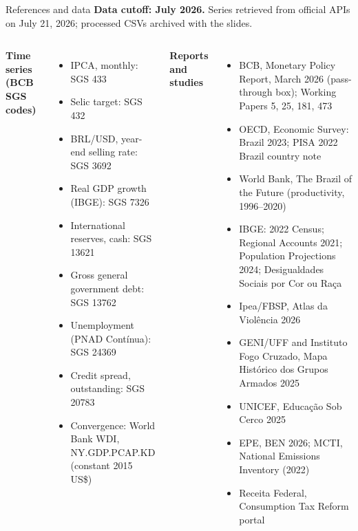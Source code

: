 \documentclass[10pt,aspectratio=169]{beamer}
\begin{document}
\begin{frame}{References and data}
  \scriptsize
  \textbf{Data cutoff: July 2026.} Series retrieved from official APIs on July 21, 2026; processed CSVs archived with the slides.
  \vspace{.2cm}
  \begin{columns}[T,onlytextwidth]
      \textbf{Time series (BCB SGS codes)}
      \begin{itemize}\scriptsize
        \item IPCA, monthly: SGS 433
        \item Selic target: SGS 432
        \item BRL/USD, year-end selling rate: SGS 3692
        \item Real GDP growth (IBGE): SGS 7326
        \item International reserves, cash: SGS 13621
        \item Gross general government debt: SGS 13762
        \item Unemployment (PNAD Contínua): SGS 24369
        \item Credit spread, outstanding: SGS 20783
        \item Convergence: World Bank WDI, NY.GDP.PCAP.KD (constant 2015 US\$)
      \end{itemize}
      \textbf{Reports and studies}
      \begin{itemize}\scriptsize
        \item BCB, Monetary Policy Report, March 2026 (pass-through box); Working Papers 5, 25, 181, 473
        \item OECD, Economic Survey: Brazil 2023; PISA 2022 Brazil country note
        \item World Bank, The Brazil of the Future (productivity, 1996--2020)
        \item IBGE: 2022 Census; Regional Accounts 2021; Population Projections 2024; Desigualdades Sociais por Cor ou Raça
        \item Ipea/FBSP, Atlas da Violência 2026
        \item GENI/UFF and Instituto Fogo Cruzado, Mapa Histórico dos Grupos Armados 2025
        \item UNICEF, Educação Sob Cerco 2025
        \item EPE, BEN 2026; MCTI, National Emissions Inventory (2022)
        \item Receita Federal, Consumption Tax Reform portal
      \end{itemize}
  \end{columns}
\end{frame}
\end{document}
